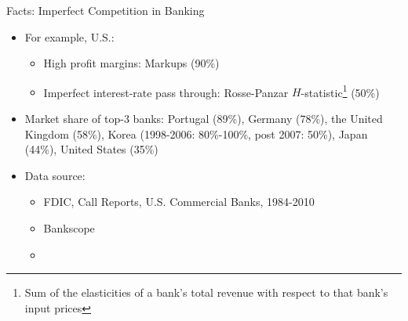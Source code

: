 \documentclass[10pt,english,slidetop,compress,
              blue,mathserif,color=option]{beamer}
\theoremstyle{plain}
\theoremstyle{definition}
\begin{document}
\begin{frame}{Facts: Imperfect Competition in Banking}


    

    \begin{itemize}
      
      \item For example, U.S.:

        \begin{itemize}
          \item High profit margins: Markups (90\%)
          \item Imperfect interest-rate pass through: Rosse-Panzar $H$-statistic\footnote{Sum of the elasticities of a bank's total revenue with respect to that bank's input prices} (50\%)
        \end{itemize}

      \medskip

      \item Market share of top-3 banks: Portugal (89\%), Germany (78\%), the United Kingdom (58\%), Korea (1998-2006: 80\%-100\%, post 2007: 50\%), Japan (44\%), United States (35\%)

      \medskip


      \item Data source:
        \begin{itemize}
          \item FDIC, Call Reports, U.S. Commercial Banks, 1984-2010
          \item Bankscope
          \item \citep[][]{CorbaeDerasmo2015, CorbaeDerasmo2018}
        \end{itemize}
    \end{itemize}
\end{frame}
\end{document}

